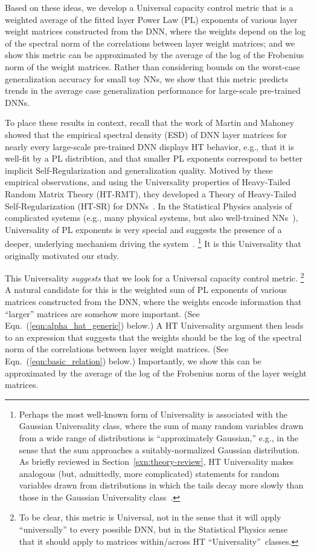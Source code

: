 Based on these ideas, we develop a Universal capacity control metric that is a weighted average of the fitted layer Power Law (PL) exponents of various layer weight matrices constructed from the DNN, where the weights depend on the log of the spectral norm of the correlations between layer weight matrices; and we show this metric can be approximated by the average of the log of the Frobenius norm of the weight matrices.
Rather than considering bounds on the worst-case generalization accuracy for small toy NNs, we show that this metric predicts trends in the average case generalization performance for large-scale pre-trained DNNs.

To place these results in context, recall that the work of Martin and Mahoney~\cite{MM18_TR} showed that the empirical spectral density (ESD) of DNN layer matrices for nearly every large-scale pre-trained DNN displays HT behavior, e.g., that it is well-fit by a PL distribtion, and that smaller PL exponents correspond to better implicit Self-Regularization and generalization quality.
Motived by these empirical observations, and using the Universality properties of Heavy-Tailed Random Matrix Theory (HT-RMT), they developed a Theory of Heavy-Tailed Self-Regularization (HT-SR) for DNNs~\cite{MM17_TR,MM18_TR}.
In the Statistical Physics analysis of complicated systems (e.g., many physical systems, but also well-trained NNs~\cite{EB01_BOOK,nishimori01}), Universality of PL exponents is very special and suggests the presence of a deeper, underlying mechanism driving the system~\cite{SornetteBook,BouchaudPotters03}.%
\footnote{Perhaps the most well-known form of Universality is associated with the Gaussian Universality class, where the sum of many random variables drawn from a wide range of distributions is ``approximately Gaussian,'' e.g., in the sense that the sum approaches a suitably-normalized Gaussian distribution.  As briefly reviewed in Section~\ref{sxn:theory-review}, HT Universality makes analogous (but, admittedly, more complicated) statements for random variables drawn from distributions in which the tails decay more slowly than those in the Gaussian Universality class~\cite{MM18_TR}.}
It is this Universality that originally motivated our study.

This Universality \emph{suggests} that we look for a Universal capacity control metric.%
\footnote{To be clear, this metric is Universal, not in the sense that it will apply ``universally'' to every possible DNN, but in the Statistical Physics sense~\cite{SornetteBook,BouchaudPotters03} that it should apply to matrices within/across HT ``Universality''~classes.}
A natural candidate for this is the weighted sum of PL exponents of various matrices constructed from the DNN, where the weights encode information that ``larger'' matrices are somehow more important.
(See Eqn.~(\ref{eqn:alpha_hat_generic}) below.)
A HT Universality argument then leads to an expression that suggests that the weights should be the log of the spectral norm of the correlations between layer weight matrices.
(See Eqn.~(\ref{eqn:basic_relation}) below.)
Importantly, we show this can be approximated by the average of the log of the Frobenius norm of the layer weight matrices.

